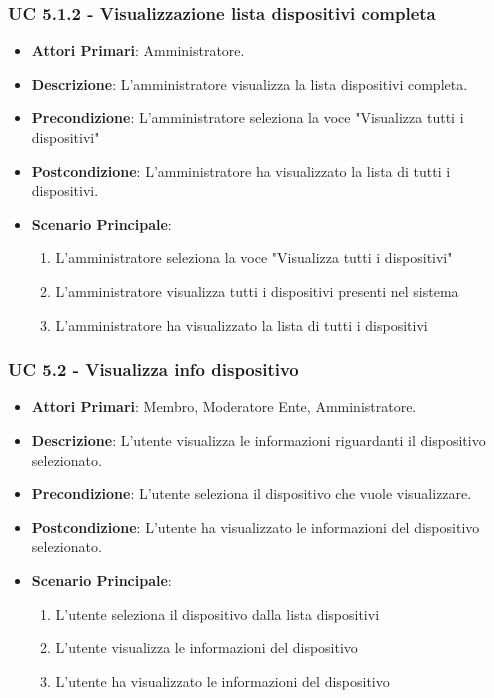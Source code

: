 			\subsubsection{UC 5.1.2 - Visualizzazione lista dispositivi completa}
			\begin{itemize}
				\item \textbf{Attori Primari}: Amministratore.
				\item \textbf{Descrizione}: L'amministratore visualizza la lista dispositivi completa.
				\item \textbf{Precondizione}: L'amministratore seleziona la voce "Visualizza tutti i dispositivi"
				\item \textbf{Postcondizione}: L'amministratore ha visualizzato la lista di tutti i dispositivi.
				\item \textbf{Scenario Principale}:
				\begin{enumerate}
					\item{L'amministratore seleziona la voce "Visualizza tutti i dispositivi"}
					\item{L'amministratore visualizza tutti i dispositivi presenti nel sistema}
					\item{L'amministratore ha visualizzato la lista di tutti i dispositivi}
				\end{enumerate}
			\end{itemize}
			
			\subsubsection{UC 5.2 - Visualizza info dispositivo}
			\begin{itemize}
				\item \textbf{Attori Primari}: Membro, Moderatore Ente, Amministratore.
				\item \textbf{Descrizione}: L'utente visualizza le informazioni riguardanti il dispositivo selezionato.
				\item \textbf{Precondizione}: L'utente seleziona il dispositivo che vuole visualizzare.
				\item \textbf{Postcondizione}: L'utente ha visualizzato le informazioni del dispositivo selezionato.
				\item \textbf{Scenario Principale}:
				\begin{enumerate}
					\item{L'utente seleziona il dispositivo dalla lista dispositivi}
					\item{L'utente visualizza le informazioni del dispositivo}
					\item{L'utente ha visualizzato le informazioni del dispositivo}
				\end{enumerate}
			\end{itemize}
			
